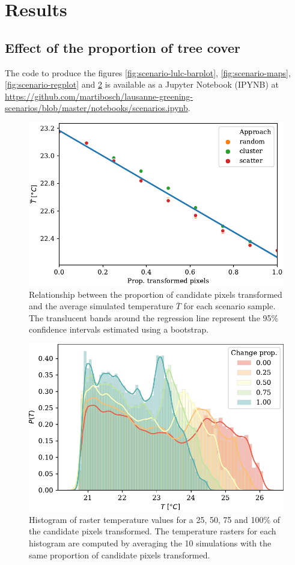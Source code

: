 \documentclass[10pt,letterpaper]{article}
\begin{document}
\section*{Results}

\subsection*{Effect of the proportion of tree cover}
\label{sec:effect-prop}

The code to produce the figures \ref{fig:scenario-lulc-barplot}, \ref{fig:scenario-maps}, \ref{fig:scenario-regplot} and \ref{fig:scenario-hists} is available as a Jupyter Notebook (IPYNB) at \url{https://github.com/martibosch/lausanne-greening-scenarios/blob/master/notebooks/scenarios.ipynb}.

\begin{figure}[H]
  \centering
  \includegraphics[width=.6\textwidth]{figures/scenario-T-regplot}
  \caption{\label{fig:scenario-T-regplot} Relationship between the proportion of candidate pixels transformed and the average simulated temperature $\overline{T}$ for each scenario sample. The translucent bands around the regression line represent the 95\% confidence intervals estimated using a bootstrap.}
\end{figure}


\begin{figure}[H]
  \centering
  \includegraphics[width=.6\textwidth]{figures/scenario-T-hists}
  \caption{\label{fig:scenario-hists} Histogram of raster temperature values for a 25, 50, 75 and 100\% of the candidate pixels transformed. The temperature rasters for each histogram are computed by averaging the 10 simulations with the same proportion of candidate pixels transformed.}
\end{figure}
\end{document}
